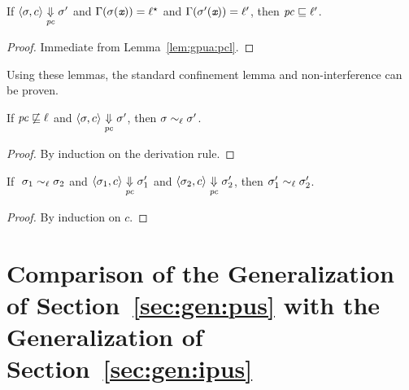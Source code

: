 \begin{mycor}
\label{cor:gpua:cor2}
If $\langle \sigma, c \rangle \underset{\mathit{pc}}{\Downarrow} \sigma'$ and
$\Gamma(\sigma(\emph{\texttt{x}})) = \ell{}^\star $ and
$\Gamma(\sigma'(\emph{\texttt{x}})) = \ell'$, then 
$\mathit{pc} \sqsubseteq \ell'$.
\end{mycor}
\begin{proof}
Immediate from Lemma~\ref{lem:gpua:pcl}.
\end{proof}

Using these lemmas, the standard confinement lemma and non-interference
can be proven. 

\begin{myLemma}
\label{lem:gpua:conf}
If $\mathit{pc} \not\sqsubseteq \ell$ and $\langle \sigma, c \rangle
\underset{\mathit{pc}}{\Downarrow} \sigma'$, then $\sigma \sim_\ell \sigma'$.
\end{myLemma}
\begin{proof}
By induction on the derivation rule.
\end{proof}

\begin{myThm}
  If $~\sigma_1 \sim_\ell \sigma_2$ and $\langle \sigma_1, c \rangle
  \underset{\mathit{pc}}{\Downarrow} \sigma_1' $ and $\langle \sigma_2, c
  \rangle\underset{\mathit{pc}}{\Downarrow} \sigma_2' $, then $\sigma_1' \sim_\ell
  \sigma_2'$.
\end{myThm}
\begin{proof} By induction on $c$.
\end{proof}




\section{Comparison of the Generalization of Section~\ref{sec:gen:pus}
  with the Generalization of Section~\ref{sec:gen:ipus}}


